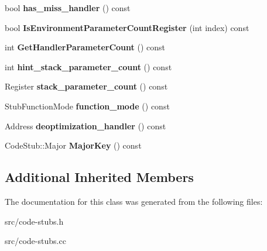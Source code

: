 \begin{DoxyCompactItemize}
\item 
\hypertarget{classv8_1_1internal_1_1_code_stub_interface_descriptor_a41ed38ad62478ef74f3f8d10e7fcfc91}{}bool {\bfseries has\+\_\+miss\+\_\+handler} () const \label{classv8_1_1internal_1_1_code_stub_interface_descriptor_a41ed38ad62478ef74f3f8d10e7fcfc91}

\item 
\hypertarget{classv8_1_1internal_1_1_code_stub_interface_descriptor_af489867e242f79f09e6e3fe93dc6df62}{}bool {\bfseries Is\+Environment\+Parameter\+Count\+Register} (int index) const \label{classv8_1_1internal_1_1_code_stub_interface_descriptor_af489867e242f79f09e6e3fe93dc6df62}

\item 
\hypertarget{classv8_1_1internal_1_1_code_stub_interface_descriptor_a706fd538c44ed9936effb4619e79f78a}{}int {\bfseries Get\+Handler\+Parameter\+Count} () const \label{classv8_1_1internal_1_1_code_stub_interface_descriptor_a706fd538c44ed9936effb4619e79f78a}

\item 
\hypertarget{classv8_1_1internal_1_1_code_stub_interface_descriptor_ab5dc1809d2e72370375103b5cff952af}{}int {\bfseries hint\+\_\+stack\+\_\+parameter\+\_\+count} () const \label{classv8_1_1internal_1_1_code_stub_interface_descriptor_ab5dc1809d2e72370375103b5cff952af}

\item 
\hypertarget{classv8_1_1internal_1_1_code_stub_interface_descriptor_a2c93cf33753c87a0035fe35d9f04306a}{}Register {\bfseries stack\+\_\+parameter\+\_\+count} () const \label{classv8_1_1internal_1_1_code_stub_interface_descriptor_a2c93cf33753c87a0035fe35d9f04306a}

\item 
\hypertarget{classv8_1_1internal_1_1_code_stub_interface_descriptor_a57f2b8f80cc8f029ec7c5993964acf8b}{}Stub\+Function\+Mode {\bfseries function\+\_\+mode} () const \label{classv8_1_1internal_1_1_code_stub_interface_descriptor_a57f2b8f80cc8f029ec7c5993964acf8b}

\item 
\hypertarget{classv8_1_1internal_1_1_code_stub_interface_descriptor_a2ee8de4fa88f2b3df404075cba8563bb}{}Address {\bfseries deoptimization\+\_\+handler} () const \label{classv8_1_1internal_1_1_code_stub_interface_descriptor_a2ee8de4fa88f2b3df404075cba8563bb}

\item 
\hypertarget{classv8_1_1internal_1_1_code_stub_interface_descriptor_a0002f84320919e1859f8e7c58bb92afb}{}Code\+Stub\+::\+Major {\bfseries Major\+Key} () const \label{classv8_1_1internal_1_1_code_stub_interface_descriptor_a0002f84320919e1859f8e7c58bb92afb}

\end{DoxyCompactItemize}
\subsection*{Additional Inherited Members}


The documentation for this class was generated from the following files\+:\begin{DoxyCompactItemize}
\item 
src/code-\/stubs.\+h\item 
src/code-\/stubs.\+cc\end{DoxyCompactItemize}

